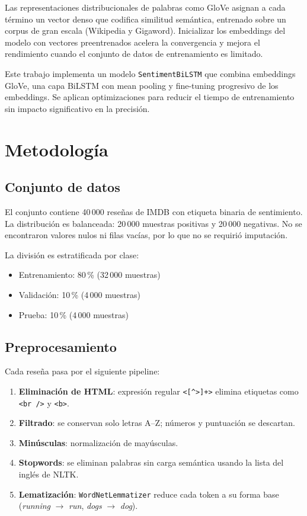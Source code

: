 \documentclass[letterpaper, 10 pt, conference]{ieeeconf}
\begin{document}
Las representaciones distribucionales de palabras como GloVe
\cite{pennington2014} asignan a cada t\'ermino un vector denso que codifica
similitud sem\'antica, entrenado sobre un corpus de gran escala (Wikipedia y
Gigaword). Inicializar los embeddings del modelo con vectores preentrenados
acelera la convergencia y mejora el rendimiento cuando el conjunto de datos
de entrenamiento es limitado.

Este trabajo implementa un modelo \texttt{SentimentBiLSTM} que combina
embeddings GloVe, una capa BiLSTM con mean pooling y fine-tuning progresivo
de los embeddings. Se aplican optimizaciones para reducir el tiempo de
entrenamiento sin impacto significativo en la precisi\'on.

\section{Metodolog\'ia}

\subsection{Conjunto de datos}

El conjunto contiene 40\,000 rese\~nas de IMDB \cite{maas2011} con etiqueta
binaria de sentimiento. La distribuci\'on es balanceada: 20\,000 muestras
positivas y 20\,000 negativas. No se encontraron valores nulos ni filas
vac\'ias, por lo que no se requiri\'o imputaci\'on.

La divisi\'on es estratificada por clase:
\begin{itemize}
  \item Entrenamiento: 80\,\% (32\,000 muestras)
  \item Validaci\'on: 10\,\% (4\,000 muestras)
  \item Prueba: 10\,\% (4\,000 muestras)
\end{itemize}

\subsection{Preprocesamiento}

Cada rese\~na pasa por el siguiente pipeline:

\begin{enumerate}
  \item \textbf{Eliminaci\'on de HTML}: expresi\'on regular
        \texttt{<[{\textasciicircum}>]+>} elimina etiquetas como
        \texttt{<br />} y \texttt{<b>}.
  \item \textbf{Filtrado}: se conservan solo letras A--Z; n\'umeros y
        puntuaci\'on se descartan.
  \item \textbf{Min\'usculas}: normalizaci\'on de may\'usculas.
  \item \textbf{Stopwords}: se eliminan palabras sin carga sem\'antica
        usando la lista del ingl\'es de NLTK.
  \item \textbf{Lematizaci\'on}: \texttt{WordNetLemmatizer} reduce cada
        token a su forma base (\textit{running} $\to$ \textit{run},
        \textit{dogs} $\to$ \textit{dog}).
\end{enumerate}
\end{document}
